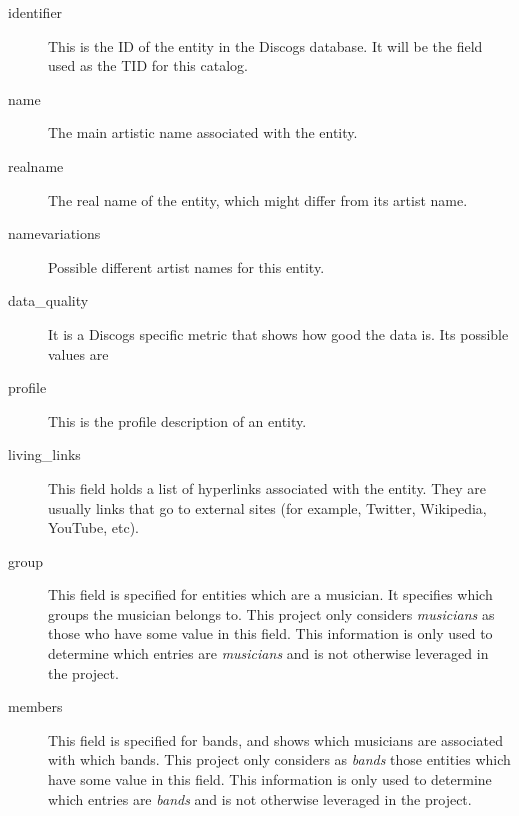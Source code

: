 \documentclass[epsfig,a4paper,11pt,titlepage,twoside,openany]{book}
\begin{document}
\begin{description}
\item[identifier] This is the ID of the entity in the Discogs database. It will be the field used as the TID for this catalog.

\item[name] The main artistic name associated with the entity.

\item[realname] The real name of the entity, which might differ from its artist name.

\item[namevariations] Possible different artist names for this entity.

\item[data\_quality] It is a Discogs specific metric that shows how good the data is. Its possible values are 

\item[profile] This is the profile description of an entity.

\item[living\_links] This field holds a list of hyperlinks associated with the entity. They are usually links that go to external sites (for example, Twitter, Wikipedia, YouTube, etc).

\item[group] This field is specified for entities which are a musician. It specifies which groups the musician belongs to. This project only considers \textit{musicians} as those who have some value in this field. This information is only used to determine which entries are \textit{musicians} and is not otherwise leveraged in the project. 

\item[members] This field is specified for bands, and shows which musicians are associated with which bands. This project only considers as \textit{bands} those entities which have some value in this field. This information is only used to determine which entries are \textit{bands} and is not otherwise leveraged in the project.

\end{description}
\end{document}
